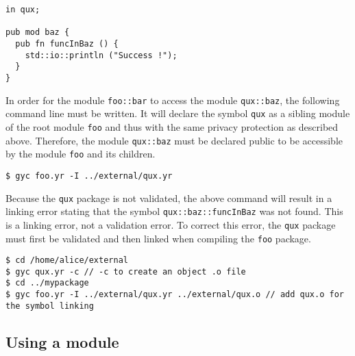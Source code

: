 \begin{lstlisting}[caption=\textit{/home/alice/external/qux.yr}, style=coloredverbatim]
in qux;

pub mod baz {
  pub fn funcInBaz () {
    std::io::println ("Success !");
  }
}
\end{lstlisting}

In order for the module \texttt{foo::bar} to access the module
\texttt{qux::baz}, the following command line must be written. It will declare
the symbol \texttt{qux} as a sibling module of the root module \texttt{foo} and
thus with the same privacy protection as described above. Therefore, the module
\texttt{qux::baz} must be declared public to be accessible by the module
\texttt{foo} and its children.

\begin{lstlisting}[style=intermediateVerb]
$ gyc foo.yr -I ../external/qux.yr
\end{lstlisting}

Because the \texttt{qux} package is not validated, the above command will result
in a linking error stating that the symbol \texttt{qux::baz::funcInBaz} was not
found. This is a linking error, not a validation error. To correct this error,
the \texttt{qux} package must first be validated and then linked when compiling
the \texttt{foo} package.

\begin{minipage}{\linewidth}
\begin{lstlisting}[style=intermediateVerb]
$ cd /home/alice/external
$ gyc qux.yr -c // -c to create an object .o file
$ cd ../mypackage
$ gyc foo.yr -I ../external/qux.yr ../external/qux.o // add qux.o for the symbol linking
\end{lstlisting}
\end{minipage}


\subsection {Using a module}

